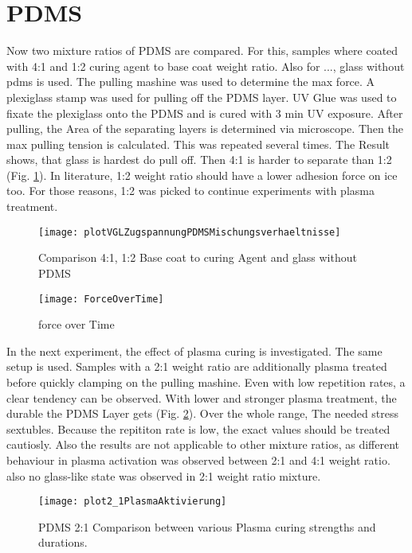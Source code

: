 \section{PDMS}

Now two mixture ratios of PDMS are compared. For this, samples where coated with 4:1 and 1:2 curing agent to base coat weight ratio. Also for ..., glass without pdms is used. The pulling mashine was used to determine the max force. A plexiglass stamp was used for pulling off the PDMS layer. UV Glue was used to fixate the plexiglass onto the PDMS and is cured with 3 min UV exposure. After pulling, the Area of the separating layers is determined via microscope. Then the max pulling tension is calculated. This was repeated several times. The Result shows, that glass is hardest do pull off. Then 4:1 is harder to separate than 1:2 (Fig. \ref{fig:vgl4:1zu1:2zuGlas}). In literature, 1:2 weight ratio should have a lower adhesion force on ice too\cite{IbanezIbanez.2022}. For those reasons, 1:2 was picked to continue experiments with plasma treatment.

\begin{figure}
	\centering
	\texttt{[image: plotVGLZugspannungPDMSMischungsverhaeltnisse]}
	\caption{Comparison 4:1, 1:2 Base coat to curing Agent and glass without PDMS}
	\label{fig:vgl4:1zu1:2zuGlas}
\end{figure}

\begin{figure}
	\centering
	\texttt{[image: ForceOverTime]}
	\caption{force over Time}
\end{figure}

In the next experiment, the effect of plasma curing is investigated. The same setup is used. Samples with a 2:1 weight ratio are additionally plasma treated before quickly clamping on the pulling mashine. Even with low repetition rates, a clear tendency can be observed. With lower and stronger plasma treatment, the durable the PDMS Layer gets (Fig. \ref{fig:PlotPlasmaAktivierung}). Over the whole range, The needed stress sextubles. Because the repititon rate is low, the exact values should be treated cautiosly. Also the results are not applicable to other mixture ratios, as different behaviour in plasma activation was observed between 2:1 and 4:1 weight ratio. also no glass-like state was observed in 2:1 weight ratio mixture.


\begin{figure}[h]
	\centering
	\texttt{[image: plot2\_1PlasmaAktivierung]}
	\caption{PDMS 2:1 Comparison between various Plasma curing strengths and durations.}
	\label{fig:PlotPlasmaAktivierung}
\end{figure}



